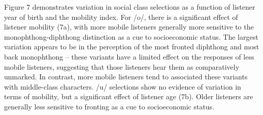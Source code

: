 \documentclass[PWPL]{article}
\begin{document}
Figure 7 demonstrates variation in social class selections as a function of listener year of birth and the mobility index. For /o/, there is a significant effect of listener mobility (7a), with more mobile listeners generally more sensitive to the monophthong-diphthong distinction as a cue to socioeconomic status. The largest variation appears to be in the perception of the most fronted diphthong and most back monophthong -- these variants have a limited effect on the responses of less mobile listeners, suggesting that those listeners hear them as comparatively unmarked. In contrast, more mobile listeners tend to associated these variants with middle-class characters. /u/ selections show no evidence of variation in terms of mobility, but a significant effect of listener age (7b). Older listeners are generally less sensitive to fronting as a cue to socioeconomic status.
\end{document}
